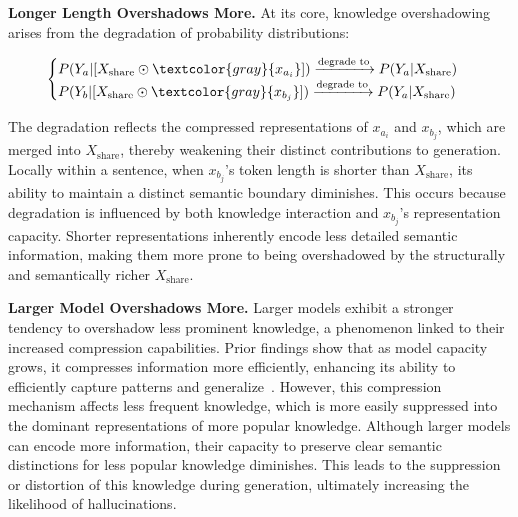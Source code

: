 \vspace{1mm}
\noindent \textbf{Longer Length Overshadows More.}
At its core, knowledge overshadowing arises from the degradation of probability distributions:

\vspace{-0.5em}
\begin{small}
    \begin{equation}
    \label{eq:prob_degrade}
    \begin{cases}
   P(Y_a | [X_{\mathrm{share}} \odot \textcolor{gray}{x_{a_i}}]) \xrightarrow{\text{degrade to}} P(Y_a | X_{\mathrm{share}})  \\
    P(Y_b | [X_{\mathrm{share}} \odot \textcolor{gray}{x_{b_j}}]) \xrightarrow{\text{degrade to}} P(Y_a | X_{\mathrm{share}}) 
\end{cases}
\end{equation}
\end{small}

\noindent The degradation reflects the compressed representations of $x_{a_i}$ and $x_{b_j}$, which are merged into $X_\mathrm{share}$, thereby weakening their distinct contributions to generation. Locally within a sentence, when $x_{b_j}$'s token length is shorter than $X_\mathrm{share}$, its ability to maintain a distinct semantic boundary diminishes. This occurs because degradation is influenced by both knowledge interaction and $x_{b_j}$'s representation capacity. Shorter representations inherently encode less detailed semantic information, making them more prone to being overshadowed by the structurally and semantically richer $X_\mathrm{share}$.




\vspace{1mm}
\noindent \textbf{Larger Model Overshadows More.}
Larger models exhibit a stronger tendency to overshadow less prominent knowledge, a phenomenon linked to their increased compression capabilities. Prior findings show that as model capacity grows, it compresses information more efficiently, enhancing its ability to efficiently capture patterns and generalize~\cite{huang2024compression}. However, this compression mechanism affects less frequent knowledge, which is more easily suppressed into the dominant representations of more popular knowledge. Although larger models can encode more information, their capacity to preserve clear semantic distinctions for less popular knowledge diminishes. This leads to the suppression or distortion of this knowledge during generation, ultimately increasing the likelihood of hallucinations. 

